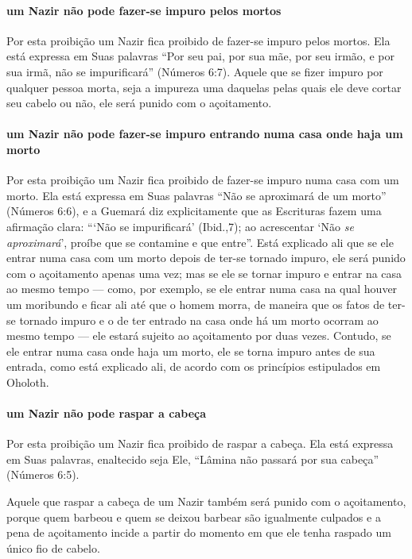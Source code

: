 \paragraph{um Nazir não pode fazer-se impuro pelos mortos}

Por esta proibição um Nazir fica proibido de fazer-se impuro pelos
mortos. Ela está expressa em Suas palavras ``Por seu pai, por sua mãe,
por seu irmão, e por sua irmã, não se impurificará'' (Números 6:7).
Aquele que se fizer impuro por qualquer pessoa morta, seja a impureza
uma daquelas pelas quais ele deve cortar seu cabelo ou não, ele será
punido com o açoitamento.

\paragraph{um Nazir não pode fazer-se impuro entrando numa casa onde haja um morto}

Por esta proibição um Nazir fica proibido de fazer-se impuro numa casa
com um morto. Ela está expressa em Suas palavras ``Não se aproximará de
um morto'' (Números 6:6), e a Guemará diz explicitamente que as
Escrituras fazem uma afirmação clara: ```Não se impurificará' (Ibid.,7);
ao acrescentar `Não \emph{se aproximará}', proíbe que se
contamine e que entre''. Está explicado ali que se ele entrar numa casa
com um morto depois de ter-se tornado impuro, ele será punido com o
açoitamento apenas uma vez; mas se ele se tornar impuro e entrar na casa
ao mesmo tempo --- como, por exemplo, se ele entrar numa casa na qual
houver um moribundo e ficar ali até que o homem morra, de maneira que
os fatos de ter-se tornado impuro e o de ter entrado na casa onde há um
morto ocorram ao mesmo tempo --- ele estará sujeito ao açoitamento por
duas vezes. Contudo, se ele entrar numa casa onde haja um morto, ele se
torna impuro antes de sua entrada, como está explicado ali, de acordo
com os princípios estipulados em Oholoth.

\paragraph{um Nazir não pode raspar a cabeça}

Por esta proibição um Nazir fica proibido de raspar a cabeça. Ela está
expressa em Suas palavras, enaltecido seja Ele, ``Lâmina não passará por
sua cabeça'' (Números 6:5).

Aquele que raspar a cabeça de um Nazir também será punido com o
açoitamento, porque quem barbeou e quem se deixou barbear são
igualmente culpados e a pena de açoitamento incide a partir do momento
em que ele tenha raspado um único fio de cabelo.

